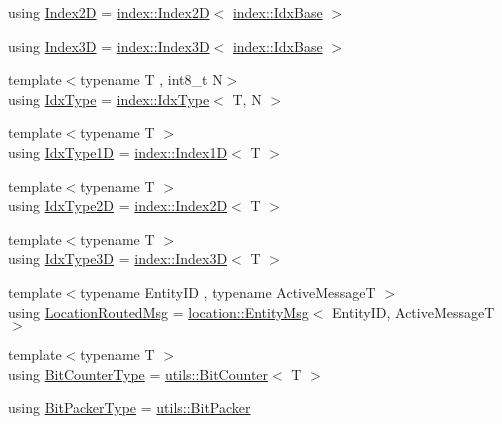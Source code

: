 \begin{DoxyCompactItemize}
\item 
using \hyperlink{namespacevt_a3bab786053b74a3d856fff1412ffa73a}{Index2D} = \hyperlink{namespacevt_1_1index_a8373801efc8343f24d6e8ba57df40a69}{index\+::\+Index2D}$<$ \hyperlink{namespacevt_1_1index_a0dbb8d47463da27c1436e8e4ddb02743}{index\+::\+Idx\+Base} $>$
\item 
using \hyperlink{namespacevt_a2c8053bc5f2df4934272542fb3e5a0bc}{Index3D} = \hyperlink{namespacevt_1_1index_a2c09a09f7346d370a0bcbbfb0d4459cd}{index\+::\+Index3D}$<$ \hyperlink{namespacevt_1_1index_a0dbb8d47463da27c1436e8e4ddb02743}{index\+::\+Idx\+Base} $>$
\item 
{\footnotesize template$<$typename T , int8\+\_\+t N$>$ }\\using \hyperlink{namespacevt_a906c25b521ff516f5e8ba6d96fe2d424}{Idx\+Type} = \hyperlink{namespacevt_1_1index_a939bace7aba6cd4a76b2c12a138c5991}{index\+::\+Idx\+Type}$<$ T, N $>$
\item 
{\footnotesize template$<$typename T $>$ }\\using \hyperlink{namespacevt_a36127c6500f2311908c959be653da40e}{Idx\+Type1D} = \hyperlink{namespacevt_1_1index_a091a4f5a7a2c993d9727eaa60cf67d81}{index\+::\+Index1D}$<$ T $>$
\item 
{\footnotesize template$<$typename T $>$ }\\using \hyperlink{namespacevt_ab0fbc5ddf69b5aa0ed6a8d1658b504eb}{Idx\+Type2D} = \hyperlink{namespacevt_1_1index_a8373801efc8343f24d6e8ba57df40a69}{index\+::\+Index2D}$<$ T $>$
\item 
{\footnotesize template$<$typename T $>$ }\\using \hyperlink{namespacevt_a65e4a83c0567ecb7a54b78e9b8e7d7ab}{Idx\+Type3D} = \hyperlink{namespacevt_1_1index_a2c09a09f7346d370a0bcbbfb0d4459cd}{index\+::\+Index3D}$<$ T $>$
\item 
{\footnotesize template$<$typename Entity\+ID , typename Active\+MessageT $>$ }\\using \hyperlink{namespacevt_a0cb65f2151629893480ef391def4e733}{Location\+Routed\+Msg} = \hyperlink{structvt_1_1location_1_1_entity_msg}{location\+::\+Entity\+Msg}$<$ Entity\+ID, Active\+MessageT $>$
\item 
{\footnotesize template$<$typename T $>$ }\\using \hyperlink{namespacevt_a34b3eb2eea8db3cf4ae27ced35b19b46}{Bit\+Counter\+Type} = \hyperlink{structvt_1_1utils_1_1_bit_counter}{utils\+::\+Bit\+Counter}$<$ T $>$
\item 
using \hyperlink{namespacevt_a80d5091925c65efd88ca7f49fe1d633b}{Bit\+Packer\+Type} = \hyperlink{structvt_1_1utils_1_1_bit_packer}{utils\+::\+Bit\+Packer}

\end{DoxyCompactItemize}
